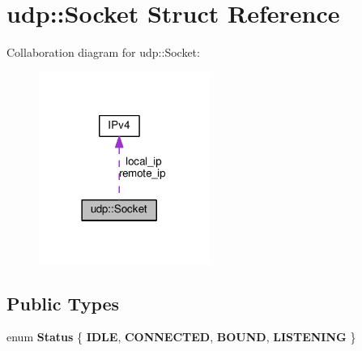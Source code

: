 \hypertarget{structudp_1_1Socket}{}\section{udp\+:\+:Socket Struct Reference}
\label{structudp_1_1Socket}


Collaboration diagram for udp\+:\+:Socket\+:
\nopagebreak
\begin{figure}[H]
\begin{center}
\leavevmode
\includegraphics[width=158pt]{structudp_1_1Socket__coll__graph}
\end{center}
\end{figure}
\subsection*{Public Types}
\begin{DoxyCompactItemize}
\item 
enum {\bfseries Status} \{ {\bfseries I\+D\+LE}, 
{\bfseries C\+O\+N\+N\+E\+C\+T\+ED}, 
{\bfseries B\+O\+U\+ND}, 
{\bfseries L\+I\+S\+T\+E\+N\+I\+NG}
 \}\hypertarget{structudp_1_1Socket_a210a8bbcc2ed79b2afdb2c36604bf6fc}{}\label{structudp_1_1Socket_a210a8bbcc2ed79b2afdb2c36604bf6fc}

\end{DoxyCompactItemize}
